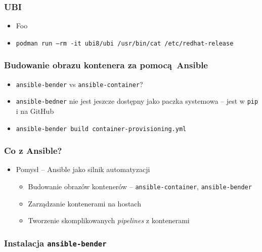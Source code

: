 \documentclass[dvipsnames,table]{beamer}
\begin{document}
\begin{frame}
	\frametitle{UBI}
	\begin{itemize}
		\item Foo
		\item {\tt podman run --rm -it ubi8/ubi /usr/bin/cat /etc/redhat-release}
	\end{itemize}
\end{frame}

\begin{frame}[fragile]
	\frametitle{Budowanie obrazu kontenera za pomocą Ansible}
%	
\begin{itemize}
	\item {\tt ansible-bender} vs {\tt ansible-container}?
	\item {\tt ansible-bedner} nie jest jeszcze dostępny jako paczka systemowa -- jest w {\tt pip} i na GitHub
	\item {\tt ansible-bender build container-provisioning.yml}
\end{itemize}
\end{frame}





\begin{frame}[fragile]
	\frametitle{Co z Ansible?}
	\begin{itemize}
		\item Pomysł -- Ansible jako silnik automatyzacji
		\begin{itemize}
			\item Budowanie obrazów kontenerów -- {\tt ansible-container}, {\tt ansible-bender}
			\item Zarządzanie kontenerami na hostach
			\item Tworzenie skomplikowanych {\it pipelines} z kontenerami
		\end{itemize}
	\end{itemize}
\end{frame}
%

\begin{frame}[fragile]
	\frametitle{Instalacja {\tt ansible-bender}}
%
\end{frame}
\end{document}
